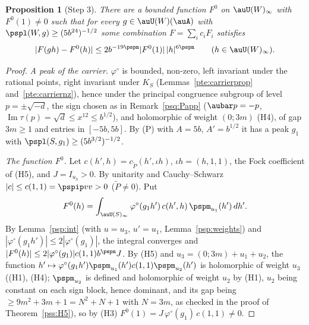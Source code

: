 \documentclass[10pt]{amsart}
\newtheorem{proposition}[theorem]{Proposition}
\theoremstyle{definition}
\theoremstyle{remark}
\newcommand{\Iml}{\operatorname{Im}}
\begin{document}
\begin{proposition}[Step 3]\label{psp:approx}
There are a bounded function $F^0$ on $\auU(W)_\infty$ with $F^0(1)\ne0$ such that for every
$g\in\auU(W)(\auA)$ with $\pspl(W,g)\ge(5b^{24})^{-1/2}$ some combination $F=\sum_ic_iF_i$ satisfies
\[
|F(gh)-F^0(h)|\le2b^{-19\pspn}|F^0(1)|\,|h|^{6\pspn}\qquad(h\in\auU(W)_\infty).
\]
\end{proposition}
\begin{proof}
\emph{A peak of the carrier.} $\varphi^\circ$ is bounded, non-zero, left invariant under the rational
points, right invariant under $K_S$ (Lemmas~\ref{pte:carrierprop} and~\ref{pte:carriernz}), hence under the principal
congruence subgroup of level $p=\pm\sqrt{-d}$, the sign chosen as in Remark~\ref{psq:Papp} ($\aubar p=-p$, $\Iml\tau(p)=\sqrt d\le x^{12}\le
b^{1/2}$), and holomorphic of weight $(0;3m)$ (H4), of gap $3m\ge1$ and entries in $[-5b,5b]$. By
(P) with $A=5b$, $A'=b^{1/2}$ it has a peak $g_1$ with $\pspl(S,g_1)\ge(5b^{3/2})^{-1/2}$.

\emph{The function $F^0$.} Let $c(h',h)=c_{\widetilde P}(h',\iota h)$, $\iota h=(h,1,1)$, the Fock
coefficient of (H5), and $J=I_{u_3}>0$. By unitarity and Cauchy--Schwarz $|c|\le c(1,1)=\pspip vv>0$
($\widetilde P\ne0$). Put
\[
F^0(h)=\int_{\auU(S)_\infty}\varphi^\circ(g_1h')\,c(h',h)\,\pspm_{u_1}(h')\,dh' .
\]
By Lemma~\ref{psp:int} (with $u=u_3$, $u'=u_1$, Lemma~\ref{psp:weights}) and $|\varphi^\circ(g_1h')|\le2
|\varphi^\circ(g_1)|$, the integral converges and $|F^0(h)|\le2|\varphi^\circ(g_1)|c(1,1)b^{\pspn}J$. By
(H5) and $u_3=(0;3m)+u_1+u_2$, the function $h'\mapsto\varphi^\circ(g_1h')\pspm_{u_1}(h')c(1,1)
\pspm_{u_2}(h')$ is holomorphic of weight $u_3$ ((H1), (H4); $\pspm_{u_2}$ is defined and holomorphic of weight $u_2$
by (H1), $u_2$ being constant on each sign block, hence dominant, and its gap being $\ge9m^2+3m+1=N^2+N+1$ with $N=3m$, as checked in the proof of
Theorem~\ref{pss:H5}), so by (H3)
$F^0(1)=J\,\varphi^\circ(g_1)\,c(1,1)\ne0$.


\end{proof}
\end{document}

